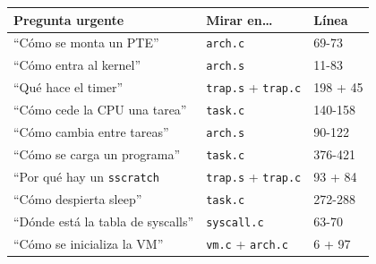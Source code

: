 \documentclass[11pt,a4paper]{article}
\begin{document}
\begin{center}
\small
\begin{tabular}{@{}lll@{}}
\toprule
Pregunta urgente & Mirar en\dots & Línea \\
\midrule
``Cómo se monta un PTE'' & \texttt{arch.c} & 69-73 \\
``Cómo entra al kernel'' & \texttt{arch.s} & 11-83 \\
``Qué hace el timer'' & \texttt{trap.s} + \texttt{trap.c} & 198 + 45 \\
``Cómo cede la CPU una tarea'' & \texttt{task.c} & 140-158 \\
``Cómo cambia entre tareas'' & \texttt{arch.s} & 90-122 \\
``Cómo se carga un programa'' & \texttt{task.c} & 376-421 \\
``Por qué hay un \texttt{sscratch} & \texttt{trap.s} + \texttt{trap.c} & 93 + 84 \\
``Cómo despierta sleep'' & \texttt{task.c} & 272-288 \\
``Dónde está la tabla de syscalls'' & \texttt{syscall.c} & 63-70 \\
``Cómo se inicializa la VM'' & \texttt{vm.c} + \texttt{arch.c} & 6 + 97 \\
\bottomrule
\end{tabular}
\end{center}
\end{document}
